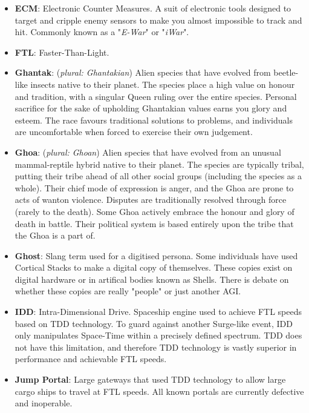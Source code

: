 \documentclass[10pt,twoside]{article}
\begin{document}
\begin{multicols}{2}
\begin{itemize}
    \item \textbf{ECM}: Electronic Counter Measures. A suit of electronic tools designed to target and cripple enemy sensors to make you almost impossible to track and hit. Commonly known as a "\textit{E-War}" or "\textit{iWar}".

    \item \textbf{FTL}: Faster-Than-Light.

    \item \textbf{Ghantak}: (\textit{plural: Ghantakian}) Alien species that have evolved from beetle-like insects native to their planet. The species place a high value on honour and tradition, with a singular Queen ruling over the entire species. Personal sacrifice for the sake of upholding Ghantakian values earns you glory and esteem. The race favours traditional solutions to problems, and individuals are uncomfortable when forced to exercise their own judgement.

    \item \textbf{Ghoa}: (\textit{plural: Ghoan}) Alien species that have evolved from an unusual mammal-reptile hybrid native to their planet. The species are typically tribal, putting their tribe ahead of all other social groups (including the species as a whole). Their chief mode of expression is anger, and the Ghoa are prone to acts of wanton violence. Disputes are traditionally resolved through force (rarely to the death). Some Ghoa actively embrace the honour and glory of death in battle. Their political system is based entirely upon the tribe that the Ghoa is a part of.

    \item \textbf{Ghost}: Slang term used for a digitised persona. Some individuals have used Cortical Stacks to make a digital copy of themselves. These copies exist on digital hardware or in artifical bodies known as Shells. There is debate on whether these copies are really "people" or just another AGI.

    \item \textbf{IDD}: Intra-Dimensional Drive. Spaceship engine used to achieve FTL speeds based on TDD technology. To guard against another Surge-like event, IDD only manipulates Space-Time within a precisely defined spectrum. TDD does not have this limitation, and therefore TDD technology is vastly superior in performance and achievable FTL speeds.

    \item \textbf{Jump Portal}: Large gateways that used TDD technology to allow large cargo ships to travel at FTL speeds. All known portals are currently defective and inoperable.


\end{itemize}
\end{multicols}
\end{document}
